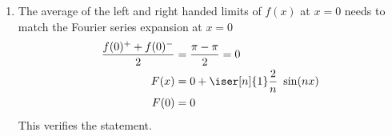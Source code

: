 \begin{enumerate}
\begin{enumerate}
\begin{figure}[H]
                    \end{figure}
          \end{enumerate}

    \item The average of the left and right handed limits of $ f(x) $ at $ x = 0 $
          needs to match the Fourier series expansion at $ x = 0 $
          \begin{align}
              \frac{f(0)^+ + f(0)^{-}}{2} & = \frac{\pi - \pi}{2} = 0 \\
              F(x)                        & =
              0 + \iser[n]{1} \frac{2}{n}\ \sin(nx)                   \\
              F(0)                        & = 0
          \end{align}
          This verifies the statement.


\end{enumerate}
